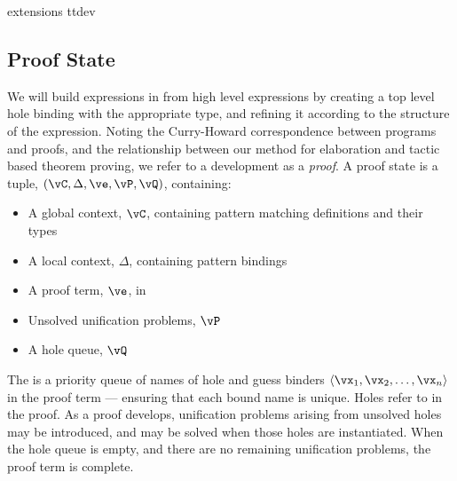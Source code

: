 {\TTdev{} extensions}
{ttdev}


\subsection{Proof State}

\label{sect:prfstate}

We will build expressions in \TT{} from high level \Idris{} expressions by
creating a top level hole binding with the appropriate type, and refining it
according to the structure of the \Idris{} expression. Noting the Curry-Howard
correspondence between programs and proofs, and the relationship between our
method for elaboration and tactic
based theorem proving, we refer to a development as a \emph{proof}.
A proof state is a tuple, $(\vC, \Delta, \ve, \vP, \vQ)$, containing:

\begin{itemize}
\item A global context, $\vC$, containing pattern matching definitions and their types
\item A local context, $\Delta$, containing pattern bindings
\item A proof term, $\ve$, in \TTdev{}
\item Unsolved unification problems, $\vP$
\item A hole queue, $\vQ$
\end{itemize}

The  is a priority queue of names of hole and guess binders 
$\langle\vx_1,\vx_2,\ldots,\vx_n\rangle$
in the proof term ---
ensuring that each bound name is unique. Holes refer to 
in the proof. As a proof develops, unification problems arising from unsolved
holes may be introduced, and may be solved when those holes are instantiated.
When the hole queue is empty, and there are no remaining unification 
problems, the proof term is complete.

